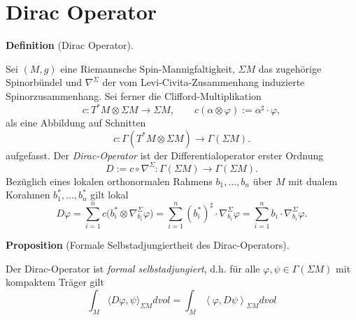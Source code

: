 \documentclass[10pt, letterpaper]{article}
\newcommand{\CustomHeading}[3]{%
  \par\medskip\noindent%
  \textbf{#1 #2} \textnormal{(#3)}.\enskip%
}
\newenvironment{DEF}[2]{\CustomHeading{Definition}{#1}{#2}}{}
\newenvironment{PROP}[2]{\CustomHeading{Proposition}{#1}{#2}}{}
\begin{document}
\pagebreak

\section{Dirac Operator}


\begin{DEF}{}{Dirac Operator}
Sei $(M,g)$ eine Riemannsche Spin-Mannigfaltigkeit, $\Sigma M$ das zugehörige
Spinorbündel und $\nabla^\Sigma$ der vom Levi-Civita-Zusammenhang induzierte
Spinorzusammenhang. Sei ferner die Clifford-Multiplikation
\[
c:T^*M\otimes \Sigma M\to \Sigma M,\qquad c(\alpha\otimes \varphi):=\alpha^\sharp\cdot\varphi,
\]
als eine Abbildung auf Schnitten
\[
c:\Gamma(T^*M\otimes \Sigma M)\to \Gamma(\Sigma M).
\]
aufgefasst. Der \emph{Dirac-Operator} ist der Differentialoperator erster Ordnung
\[
D:=c\circ \nabla^\Sigma:\Gamma(\Sigma M)\to \Gamma(\Sigma M).
\]
Bezüglich eines lokalen orthonormalen Rahmens $b_1,\dots,b_n$ über $M$ mit dualem
Korahmen $b_1^*,\dots,b_n^*$ gilt lokal
\[
D\varphi
=
\sum_{i=1}^n c\bigl(b_i^*\otimes \nabla^\Sigma_{b_i}\varphi\bigr)
=
\sum_{i=1}^n (b_i^*)^\sharp\cdot \nabla^\Sigma_{b_i}\varphi
=
\sum_{i=1}^n b_i\cdot \nabla^\Sigma_{b_i}\varphi.
\]
\end{DEF}


\begin{PROP}{}{Formale Selbstadjungiertheit des Dirac-Operators} 
  Der Dirac-Operator ist \emph{formal selbstadjungiert}, d.h. für alle $\varphi,\psi \in \Gamma(\Sigma M)$ mit kompaktem Träger gilt
  $$
  \int_M\langle D \varphi, \psi\rangle_{\Sigma M} dvol = \int_M\left\langle \varphi, D \psi\right\rangle_{\Sigma M} dvol
  $$
\end{PROP}
\end{document}
